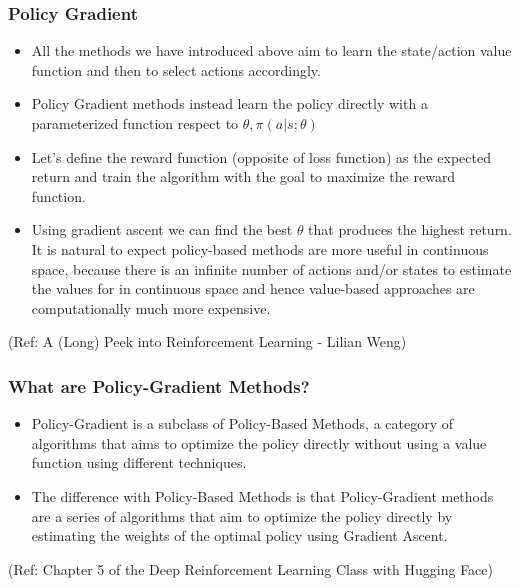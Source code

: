 \begin{frame}[fragile]\frametitle{Policy Gradient}

\begin{itemize}
\item All the methods we have introduced above aim to learn the state/action value function and then to
select actions accordingly. 
\item Policy Gradient methods instead learn the policy directly with a parameterized function respect to $\theta,\pi(a|s;\theta)$
\item Let’s define the reward function (opposite of loss
function) as the expected return and train the algorithm with the goal to maximize the reward function.
\item Using gradient ascent we can find the best $\theta$ that produces the highest return. It is natural to expect
policy-based methods are more useful in continuous space, because there is an infinite number of
actions and/or states to estimate the values for in continuous space and hence value-based
approaches are computationally much more expensive.
\end{itemize}

{\tiny (Ref: A (Long) Peek into Reinforcement Learning - Lilian Weng)}


\end{frame}

\begin{frame}[fragile]\frametitle{What are Policy-Gradient Methods?}

\begin{itemize}
\item Policy-Gradient is a subclass of Policy-Based Methods, a category of algorithms that aims to optimize the policy directly without using a value function using different techniques. 
\item The difference with Policy-Based Methods is that Policy-Gradient methods are a series of algorithms that aim to optimize the policy directly by estimating the weights of the optimal policy using Gradient Ascent.
\end{itemize}

{\tiny (Ref: Chapter 5 of the Deep Reinforcement Learning Class with Hugging Face)}

\end{frame}

